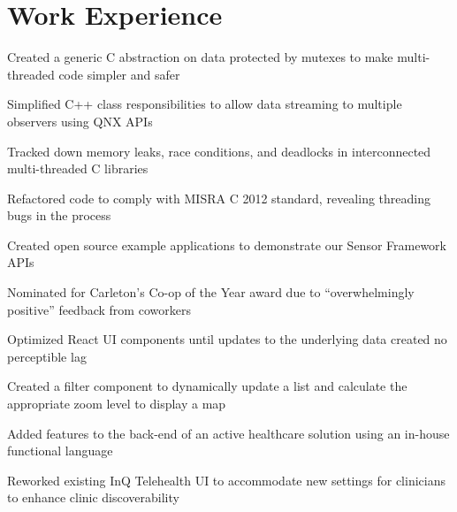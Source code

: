 \section{Work Experience}

\begin{bullets}
	\item Created a generic C abstraction on data protected by mutexes to make multi-threaded code simpler and safer
	\item Simplified C++ class responsibilities to allow data streaming to multiple observers using QNX APIs
	\item Tracked down memory leaks, race conditions, and deadlocks in interconnected multi-threaded C libraries
    \item Refactored code to comply with MISRA C 2012 standard, revealing threading bugs in the process
    \item Created open source example applications to demonstrate our Sensor Framework APIs
\end{bullets}

\hbox{}

\begin{bullets}
	\item Nominated for Carleton's Co-op of the Year award due to ``overwhelmingly positive'' feedback from coworkers
    \item Optimized React UI components until updates to the underlying data created no perceptible lag
    \item Created a filter component to dynamically update a list and calculate the appropriate zoom level to display a map
    \item Added features to the back-end of an active healthcare solution using an in-house functional language
    \item Reworked existing InQ Telehealth UI to accommodate new settings for clinicians to enhance clinic discoverability
\end{bullets}

\hbox{}

